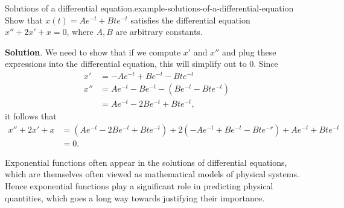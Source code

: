 \documentclass[10pt,]{book}
\numberwithin{equation}{section}
\begin{document}
\begin{example}{Solutions of a differential equation.}{example-solutions-of-a-differential-equation}%
\hypertarget{p-232}{}%
Show that \(x(t) = Ae^{-t} + Bte^{-t}\) satisfies the differential equation \(x'' + 2x' + x = 0\), where \(A,B\) are arbitrary constants.%
\par\smallskip%
\noindent\textbf{Solution}.\hypertarget{solution-50}{}\quad%
\hypertarget{p-233}{}%
We need to show that if we compute \(x'\) and \(x''\) and plug these expressions into the differential equation, this will simplify out to \(0\). Since%
\begin{align*}
x' & = -Ae^{-t} +Be^{-t} - Bte^{-t} \\
x'' & = Ae^{-t} - Be^{-t} - (Be^{-t} - Bte^{-t}) \\
& = Ae^{-t} - 2Be^{-t} + Bte^{-t}, 
\end{align*}
it follows that%
\begin{align*}
x'' + 2x' + x & = (Ae^{-t} - 2Be^{-t} + Bte^{-t}) + 2(-Ae^{-t} + Be^{-t} - Bte^{-r}) + Ae^{-t} + Bte^{-t} \\
& = 0. 
\end{align*}
%
\end{example}
\hypertarget{p-234}{}%
Exponential functions often appear in the solutions of differential equations, which are themselves often viewed as mathematical models of physical systems. Hence exponential functions play a significant role in predicting physical quantities, which goes a long way towards justifying their importance.%
%
%
\typeout{************************************************}
\typeout{************************************************}
%
\end{document}
